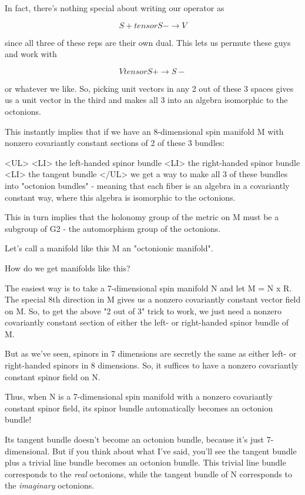 In fact, there's nothing special about writing our operator as

$$
S+ tensor S- \to  V
$$
    
since all three of these reps are their own dual.  This lets us
permute these guys and work with

$$
V tensor S+ \to  S-
$$
    
or whatever we like.   So, picking unit vectors in any 2 out of these
3 spaces gives us a unit vector in the third and makes all 3 into an
algebra isomorphic to the octonions.

This instantly implies that if we have an 8-dimensional spin manifold M 
with nonzero covariantly constant sections of 2 of these 3 bundles:
 
<UL>
<LI>
the left-handed spinor bundle
<LI>
the right-handed spinor bundle
<LI>
the tangent bundle
</UL>
we get a way to make all 3 of these bundles into "octonion bundles" -
meaning that each fiber is an algebra in a covariantly constant way, 
where this algebra is isomorphic to the octonions.

This in turn implies that the holonomy group of the metric on M must 
be a subgroup of G2 - the automorphism group of the octonions.  

Let's call a manifold like this M an "octonionic manifold".

How do we get manifolds like this?
 
The easiest way is to take a 7-dimensional spin manifold N and let 
M = N x R.  The special 8th direction in M gives us a nonzero 
covariantly constant vector field on M.  So, to get the above 
"2 out of 3" trick to work, we just need a nonzero covariantly 
constant section of either the left- or right-handed spinor bundle 
of M.

But as we've seen, spinors in 7 dimensions are secretly the same
as either left- or right-handed spinors in 8 dimensions.  So, it
suffices to have a nonzero covariantly constant spinor field on N.

Thus, when N is a 7-dimensional spin manifold with a nonzero covariantly 
constant spinor field, its spinor bundle automatically becomes an octonion 
bundle!  


Its tangent bundle doesn't become an octonion bundle, because it's
just 7-dimensional.  But if you think about what I've said, you'll see
the tangent bundle plus a trivial line bundle becomes an octonion
bundle.  This trivial line bundle corresponds to the \emph{real}
octonions, while the tangent bundle of N corresponds to the
\emph{imaginary} octonions.


